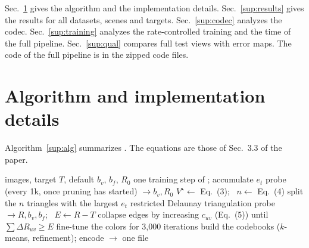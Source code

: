 \appendix
\setcounter{table}{0}
\setcounter{figure}{0}
\setcounter{equation}{0}
\setcounter{algorithm}{0}
\providecommand{\MipNeRF}{\emph{Mip-NeRF~360}\xspace}
\providecommand{\TandT}{\emph{Tanks and Temples}\xspace}
\providecommand{\DeepBlending}{\emph{Deep Blending}\xspace}
\providecommand{\NeRFSyn}{\emph{NeRF-Synthetic}\xspace}

Sec.~\ref{sup:impl} gives the algorithm and the implementation details. Sec.~\ref{sup:results} gives the results for all datasets, scenes and targets. Sec.~\ref{sup:codec} analyzes the codec. Sec.~\ref{sup:training} analyzes the rate-controlled training and the time of the full pipeline. Sec.~\ref{sup:qual} compares full test views with error maps. The code of the full pipeline is in the zipped code files.

\section{Algorithm and implementation details}
\label{sup:impl}

Algorithm~\ref{sup:alg} summarizes \BM. The equations are those of Sec.~3.3 of the paper.

\begin{algorithm}[h]
\caption{\BM for a target file size $T$}
\label{sup:alg}
\small
\begin{algorithmic}[1]
\Require images, target $T$, default $b_v$, $b_f$, $R_0$
  \State one training step of \MS; accumulate $e_t$
    \State probe (every 1k, once pruning has started) $\rightarrow b_v, R_0$
    \State $V^\star \gets$ Eq.~(3); \ $n \gets$ Eq.~(4)
    \State split the $n$ triangles with the largest $e_t$
  \EndIf
   restricted Delaunay triangulation \EndIf
    \State probe $\rightarrow R, b_v, b_f$; \ $E \gets R - T$
      \State collapse edges by increasing $c_{uv}$ (Eq.~(5)) until $\sum \Delta R_{uv} \ge E$
    \EndIf
  \EndIf
\EndFor
\State fine-tune the colors for 3{,}000 iterations
\State build the codebooks ($k$-means, refinement); encode $\rightarrow$ one file
\end{algorithmic}
\end{algorithm}

